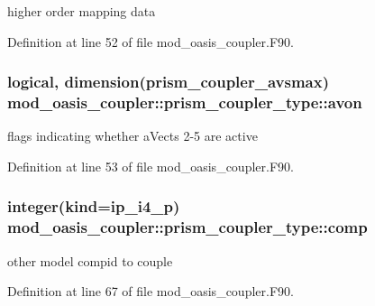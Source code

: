higher order mapping data 



Definition at line 52 of file mod\+\_\+oasis\+\_\+coupler.\+F90.

\hypertarget{structmod__oasis__coupler_1_1prism__coupler__type_aa2090cc6941c0dbbbf4bdb5c68cff873}{
\subsubsection[{avon}]{\setlength{\rightskip}{0pt plus 5cm}logical, dimension({\bf prism\+\_\+coupler\+\_\+avsmax}) mod\+\_\+oasis\+\_\+coupler\+::prism\+\_\+coupler\+\_\+type\+::avon\hspace{0.3cm}{\ttfamily [private]}}}\label{structmod__oasis__coupler_1_1prism__coupler__type_aa2090cc6941c0dbbbf4bdb5c68cff873}


flags indicating whether a\+Vects 2-\/5 are active 



Definition at line 53 of file mod\+\_\+oasis\+\_\+coupler.\+F90.

\hypertarget{structmod__oasis__coupler_1_1prism__coupler__type_a77cc2858814776053af5f3958d29fee2}{
\subsubsection[{comp}]{\setlength{\rightskip}{0pt plus 5cm}integer(kind=ip\+\_\+i4\+\_\+p) mod\+\_\+oasis\+\_\+coupler\+::prism\+\_\+coupler\+\_\+type\+::comp\hspace{0.3cm}{\ttfamily [private]}}}\label{structmod__oasis__coupler_1_1prism__coupler__type_a77cc2858814776053af5f3958d29fee2}


other model compid to couple 



Definition at line 67 of file mod\+\_\+oasis\+\_\+coupler.\+F90.

